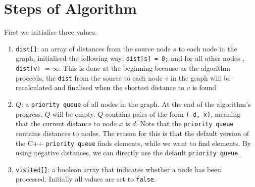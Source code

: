 \documentclass[twoside,12pt,a4paper,english]{book}
\theoremstyle{definition}
\theoremstyle{problemstyle}
\begin{document}
\section{Steps of Algorithm}

First we initialise three values:
\begin{enumerate}
    \item \texttt{dist[]}: an array of distances from the source node $s$ to each node in the graph, initialised the following way: \texttt{dist[s] = 0;} and for all other nodes , \texttt{dist[v]} $= \infty$. This is done at the beginning because as the algorithm proceeds, the \texttt{dist} from the source to each node $v$ in the graph will be recalculated and finalised when the shortest distance to $v$ is found
    
    \item $Q$: a \texttt{priority queue} of all nodes in the graph. At the end of the algorithm's progress, $Q$ will be empty. $Q$ contains pairs of the form \texttt{(-d, x)}, meaning that the current distance to node $x$ is $d$. Note that the \texttt{priority queue} contains  distances to nodes. The reason for this is that the default version of the C++ \texttt{priority queue} finds  elements, while we want to find  elements. By using negative distances, we can directly use the default \texttt{priority queue}. 
    
    \item \texttt{visited[]}: a boolean array that indicates whether a node has
    been processed. Initially all values are set to \texttt{false}.
\end{enumerate}
\end{document}
